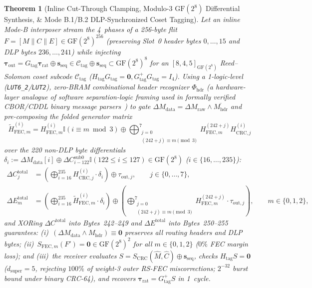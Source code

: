 \documentclass[10pt,twocolumn]{article}
\theoremstyle{spectralthm}
\newtheorem{theorem}{Theorem}[section]
\begin{document}
\begin{theorem}[Inline Cut-Through Clamping, Modulo-3 $\mathrm{GF}(2^8)$ Differential Synthesis, \& Mode B.1/B.2 DLP-Synchronized Coset Tagging]
\label{thm:modeb}
Let an inline Mode-B interposer stream the 4~phases of a 256-byte flit $F = [M \parallel C \parallel E] \in \mathrm{GF}(2^8)^{256}$ (preserving Slot~0 header bytes $0,\ldots,15$ and DLP bytes $236,\ldots,241$) while injecting $\boldsymbol{\tau}_{\mathrm{out}} = G_{\mathrm{tag}}\boldsymbol{\tau}_{\mathrm{rat}} \oplus \mathbf{s}_{\mathrm{seq}} \in \mathcal{C}_{\mathrm{tag}} \oplus \mathbf{s}_{\mathrm{seq}} \subset \mathrm{GF}(2^8)^8$ for an $[8,4,5]_{\mathrm{GF}(2^8)}$ Reed--Solomon coset subcode $\mathcal{C}_{\mathrm{tag}}$ ($H_{\mathrm{tag}}G_{\mathrm{tag}} = \mathbf{0}, G_{\mathrm{tag}}^+ G_{\mathrm{tag}} = I_4$). Using a 1-logic-level (\mbox{\texttt{LUT6\_2}}/\texttt{LUT2}), zero-BRAM combinational header recognizer $\Phi_{\mathrm{hdr}}$ (a hardware-layer analogue of software separation-logic framing used in formally verified CBOR/CDDL binary message parsers~\cite{ramananandro2025secure}) to gate $\Delta M_{\mathrm{data}} = \Delta M_{\mathrm{raw}} \wedge \overline{M_{\mathrm{hdr}}}$ and pre-composing the folded generator matrix
\begin{equation}
\label{eq:h_tilde_def}
\tilde{H}_{\mathrm{FEC},m}^{(i)} = H_{\mathrm{FEC},m}^{(i)} \mathbb{I}(i \equiv m \bmod 3)
\oplus \bigoplus_{\substack{j=0 \\ (242+j) \equiv m \pmod 3}}^7 H_{\mathrm{FEC},m}^{(242+j)} H_{\mathrm{CRC},j}^{(i)}
\end{equation}
over the 220 non-DLP byte differentials $\delta_i := \Delta M_{\mathrm{data}}[i] \oplus \Delta C_{i-122}^{\mathrm{sub0}} \mathbb{I}(122 \le i \le 127) \in \mathrm{GF}(2^8)$ ($i \in \{16,\ldots,235\}$):
\begin{align}
\Delta C_j^{\mathrm{total}} &= \left(\bigoplus_{i=16}^{235} H_{\mathrm{CRC},j}^{(i)} \cdot \delta_i\right) \oplus \tau_{\mathrm{out},j}, \qquad j \in \{0,\ldots,7\}, \label{eq:delta_crc}\\
\Delta E_m^{\mathrm{total}} &= \left(\bigoplus_{i=16}^{235} \tilde{H}_{\mathrm{FEC},m}^{(i)} \cdot \delta_i\right)
\oplus \left(\bigoplus_{\substack{j=0 \\ (242+j) \equiv m \pmod 3}}^7 H_{\mathrm{FEC},m}^{(242+j)} \cdot \tau_{\mathrm{out},j}\right), \qquad m \in \{0,1,2\}, \label{eq:delta_fec}
\end{align}
and XORing $\Delta C^{\mathrm{total}}$ into Bytes~242--249 and $\Delta E^{\mathrm{total}}$ into Bytes~250--255 guarantees: (i)~$(\Delta M_{\mathrm{data}} \wedge M_{\mathrm{hdr}}) \equiv \mathbf{0}$ preserves all routing headers and DLP bytes; (ii)~$S_{\mathrm{FEC},m}(F') = \mathbf{0} \in \mathrm{GF}(2^8)^2$ for all $m \in \{0,1,2\}$ ($0\%$ FEC margin loss); and (iii)~the receiver evaluates $S = S_{\mathrm{CRC}}(\hat{M},\hat{C}) \oplus \mathbf{s}_{\mathrm{seq}}$, checks $H_{\mathrm{tag}} S = \mathbf{0}$ ($d_{\mathrm{super}} = 5$, rejecting $100\%$ of weight-3 outer RS-FEC miscorrections; $2^{-32}$ burst bound under binary CRC-64), and recovers $\boldsymbol{\tau}_{\mathrm{rat}} = G_{\mathrm{tag}}^+ S$ in 1~cycle.
\end{theorem}
\end{document}
